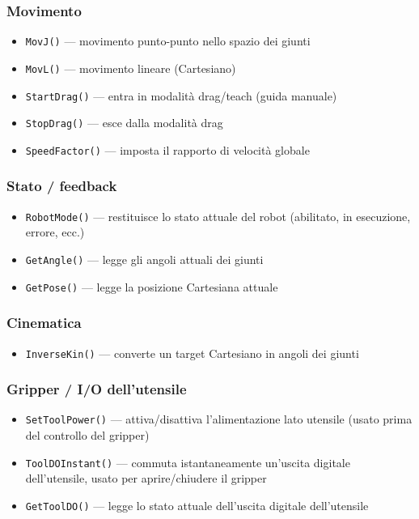 \documentclass[11pt,a4paper]{article}
\newcommand{\code}[1]{\lstinline[style=inline]{#1}}
\begin{document}
\subsubsection*{Movimento}
\begin{itemize}[leftmargin=1.2cm]
    \item \code{MovJ()} --- movimento punto-punto nello spazio dei giunti
    \item \code{MovL()} --- movimento lineare (Cartesiano)
    \item \code{StartDrag()} --- entra in modalità drag/teach (guida manuale)
    \item \code{StopDrag()} --- esce dalla modalità drag
    \item \code{SpeedFactor()} --- imposta il rapporto di velocità globale
\end{itemize}

\subsubsection*{Stato / feedback}
\begin{itemize}[leftmargin=1.2cm]
    \item \code{RobotMode()} --- restituisce lo stato attuale del robot (abilitato, in esecuzione, errore, ecc.)
    \item \code{GetAngle()} --- legge gli angoli attuali dei giunti
    \item \code{GetPose()} --- legge la posizione Cartesiana attuale
\end{itemize}

\subsubsection*{Cinematica}
\begin{itemize}[leftmargin=1.2cm]
    \item \code{InverseKin()} --- converte un target Cartesiano in angoli dei giunti
\end{itemize}

\subsubsection*{Gripper / I/O dell'utensile}
\begin{itemize}[leftmargin=1.2cm]
    \item \code{SetToolPower()} --- attiva/disattiva l'alimentazione lato utensile (usato prima del controllo del gripper)
    \item \code{ToolDOInstant()} --- commuta istantaneamente un'uscita digitale dell'utensile, usato per aprire/chiudere il gripper
    \item \code{GetToolDO()} --- legge lo stato attuale dell'uscita digitale dell'utensile
\end{itemize}
\end{document}
